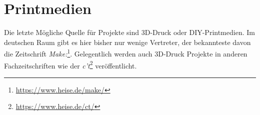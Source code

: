 \section{Printmedien}
Die letzte Mögliche Quelle für Projekte sind 3D-Druck oder \ac{DIY}-Printmedien. Im deutschen Raum gibt es hier bisher nur wenige Vertreter, der bekannteste davon die Zeitschrift \textit{Make:}\footnote{\url{https://www.heise.de/make/}}. Gelegentlich werden auch 3D-Druck Projekte in anderen Fachzeitschriften wie der \textit{c't}\footnote{\url{https://www.heise.de/ct/}} veröffentlicht.